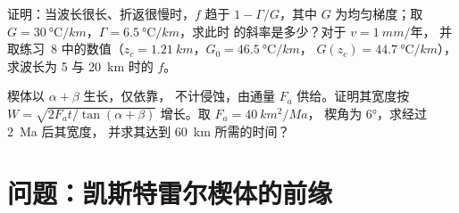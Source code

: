 \begin{exercise}[$\star\star\star$]\label{exo:b3:orogenic-wedges:11}
证明：当波长很长、折返很慢时，$f$ 趋于
$1 - \Gamma/G$，其中 $G$ 为均匀梯度；取 $G =
\qty{30}{\celsius/km}$，$\Gamma = \qty{6.5}{\celsius/km}$，求此时
的斜率是多少？对于 $v = \qty{1}{mm/\text{年}}$，
并取练习~8 中的数值（$z_c = \qty{1.21}{km}$，$G_0 = \qty{46.5}{\celsius/km}$，
$G(z_c) = \qty{44.7}{\celsius/km}$），求波长为 5 与
\qty{20}{km} 时的 $f$。
\end{exercise}

\begin{exercise}[$\star\star\star$]\label{exo:b3:orogenic-wedges:12}
楔体以 $\alpha + \beta$ 生长，仅依靠，
不计侵蚀，由通量 $F_a$ 供给。证明其宽度按
$W = \sqrt{2F_at/\tan(\alpha + \beta)}$ 增长。取 $F_a = \qty{40}{km^2/Ma}$，
楔角为 \ang{6}，求经过 \qty{2}{Ma} 后其宽度，
并求其达到 \qty{60}{km} 所需的时间？
\end{exercise}

\section{问题：凯斯特雷尔楔体的前缘}

